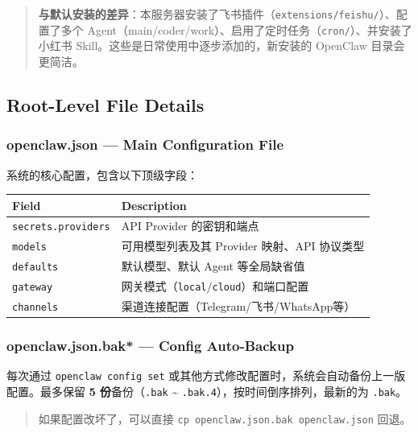 \begin{quote}
\textbf{与默认安装的差异}：本服务器安装了飞书插件（\texttt{extensions/feishu/}）、配置了多个 Agent（main/coder/work）、启用了定时任务（\texttt{cron/}）、并安装了小红书 Skill。这些是日常使用中逐步添加的，新安装的 OpenClaw 目录会更简洁。
\end{quote}

\subsection{Root-Level File Details}


\subsubsection{openclaw.json --- Main Configuration File}


系统的核心配置，包含以下顶级字段：

\begin{table}[h]
\centering
\small
\begin{tabular}{|l|p{}|}
\hline
Field & Description \\
\hline
\texttt{secrets.providers} & API Provider 的密钥和端点 \\
\hline
\texttt{models} & 可用模型列表及其 Provider 映射、API 协议类型 \\
\hline
\texttt{defaults} & 默认模型、默认 Agent 等全局缺省值 \\
\hline
\texttt{gateway} & 网关模式（\texttt{local}/\texttt{cloud}）和端口配置 \\
\hline
\texttt{channels} & 渠道连接配置（Telegram/飞书/WhatsApp等） \\
\hline
\end{tabular}
\end{table}

\subsubsection{openclaw.json.bak* --- Config Auto-Backup}


每次通过 \texttt{openclaw config set} 或其他方式修改配置时，系统会自动备份上一版配置。最多保留 \textbf{5 份}备份（\texttt{.bak} \textasciitilde{} \texttt{.bak.4}），按时间倒序排列，最新的为 \texttt{.bak}。

\begin{quote}
如果配置改坏了，可以直接 \texttt{cp openclaw.json.bak openclaw.json} 回退。
\end{quote}

